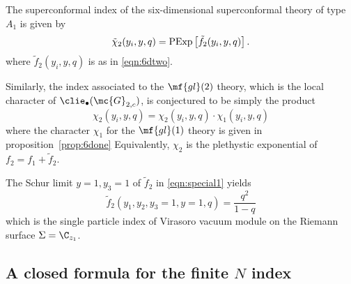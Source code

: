 \begin{conj}\label{conj:6dtwo}
The superconformal index of the six-dimensional superconformal theory of type $A_1$ is given by
\[
\tilde \chi_{2} (y_i,y,q) = {\rm PExp} \left[\tilde f_2(y_i,y,q) \right] .
\]
where $\tilde f_2(y_i,y,q)$ is as in \eqref{eqn:6dtwo}.
\end{conj}

Similarly, the index associated to the $\mf{gl}(2)$ theory, which is the local character of $\clie_\bullet(\mc{G}_{2,c})$, is conjectured to be simply the product 
\[
\chi_{2} (y_i,y,q) = \chi_{2} (y_i,y,q) \cdot \chi_{1}(y_i,y,q)
\]
where the character $\chi_{1}$ for the $\mf{gl}(1)$ theory is given in proposition~\ref{prop:6done}
Equivalently, $\chi_2$ is the plethystic exponential of $f_2 = f_1 + \tilde f_2$. 

%

\parsec[]

The Schur limit $y=1, y_3=1$ of $\tilde f_2$ in \eqref{eqn:special1} yields 
\[
\tilde f_{2}(y_1, y_2, y_3=1, y=1, q) = \frac{q^2}{1-q} 
\]
which is the single particle index of Virasoro vacuum module on the Riemann surface $\Sigma = \C_{z_1}$. 

\subsection{A closed formula for the finite $N$ index}

